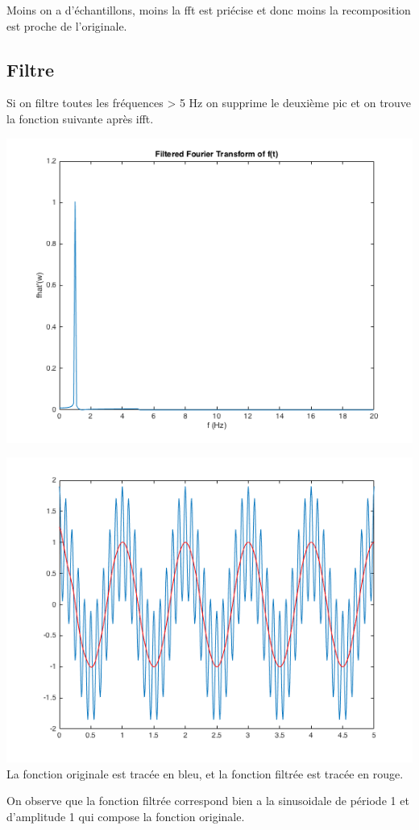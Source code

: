 \documentclass[a4paper,11pt]{article}
\begin{document}
Moins on a d'échantillons, moins la fft est priécise et donc moins la recomposition est proche de l'originale.

\subsection{Filtre}
Si on filtre toutes les fréquences > 5 Hz on supprime le deuxième pic et on trouve la fonction suivante après ifft.
\begin{center}
\includegraphics[scale=0.6]{"fhatlow.png"} \newline
\end{center}
\begin{center}
\includegraphics[scale=0.6]{"f_and_Fhatlow.png"} \newline
La fonction originale est tracée en bleu, et la fonction filtrée est tracée en rouge.
\end{center}
On observe que la fonction filtrée correspond bien a la sinusoidale de période 1 et d'amplitude 1 qui compose la fonction originale. \newline
\end{document}
